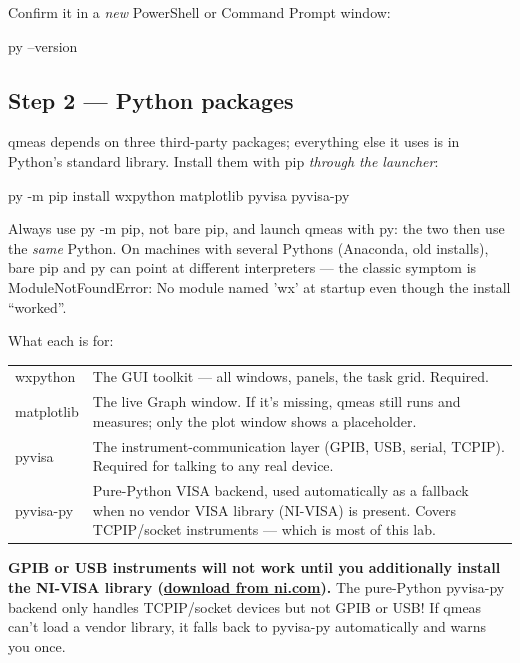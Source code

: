\documentclass[11pt,a4paper]{article}
\newcommand{\code}[1]{{\ttfamily\color{qcode}#1}}
\begin{document}
Confirm it in a \emph{new} PowerShell or Command Prompt window:

\begin{cmd}
py --version
\end{cmd}

\subsection{Step 2 --- Python packages}

qmeas depends on three third-party packages; everything else it uses is in
Python's standard library. Install them with pip \emph{through the launcher}:

\begin{cmd}
py -m pip install wxpython matplotlib pyvisa pyvisa-py
\end{cmd}

Always use \code{py -m pip}, not bare \code{pip}, and launch qmeas with
\code{py}: the two then use the \emph{same} Python. On machines with several
Pythons (Anaconda, old installs), bare \code{pip} and \code{py} can point at
different interpreters --- the classic symptom is
\code{ModuleNotFoundError: No module named 'wx'} at startup even though the
install ``worked''.

What each is for:

\begin{center}\small
\begin{tabular}{@{}p{2.9cm}p{10.7cm}@{}}
\toprule
\code{wxpython} & The GUI toolkit --- all windows, panels, the task grid.
  Required. \\
\code{matplotlib} & The live Graph window. If it's missing, qmeas still
  runs and measures; only the plot window shows a placeholder. \\
\code{pyvisa} & The instrument-communication layer (GPIB, USB, serial,
  TCPIP). Required for talking to any real device. \\
\code{pyvisa-py} & Pure-Python VISA backend, used automatically as a
  fallback when no vendor VISA library (NI-VISA) is present. Covers
  TCPIP/socket instruments --- which is most of this lab. \\
\bottomrule
\end{tabular}
\end{center}

\begin{warn}
\textbf{GPIB or USB instruments will not work until you additionally install
the NI-VISA library
(\href{https://www.ni.com/en/support/downloads/drivers/download.ni-visa.html}{download
from ni.com}).} The pure-Python \code{pyvisa-py} backend only handles
TCPIP/socket devices but not GPIB or USB! If qmeas can't load a vendor
library, it falls back to \code{pyvisa-py} automatically and warns you once.
\end{warn}
\end{document}
